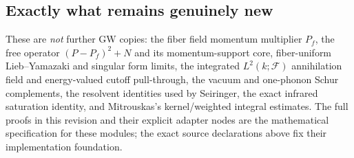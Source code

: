 \documentclass[11pt,a4paper]{article}
\theoremstyle{remark}\newtheorem{remark}[theorem]{Remark}
\newcommand{\F}{\mathcal F}\newcommand{\Q}{\mathcal Q}\newcommand{\HH}{\mathcal H}
\begin{document}
\subsection{Exactly what remains genuinely new}
These are \emph{not} further GW copies: the fiber field momentum multiplier $P_f$, the free operator $(P-P_f)^2+N$ and its momentum-support core, fiber-uniform Lieb--Yamazaki and singular form limits, the integrated $L^2(k;\F)$ annihilation field and energy-valued cutoff pull-through, the vacuum and one-phonon Schur complements, the resolvent identities used by Seiringer, the exact infrared saturation identity, and Mitrouskas's kernel/weighted integral estimates. The full proofs in this revision and their explicit adapter nodes are the mathematical specification for these modules; the exact source declarations above fix their implementation foundation.
\end{document}
